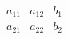 \documentclass[a4paper, 12pt]{article}
\begin{document}
    \[\begin{array}{||cc|c||} %
        a_{11} & a_{12} & b_1\\ %
        a_{21} & a_{22} & b_2 %
    \end{array}\]
\end{document}
